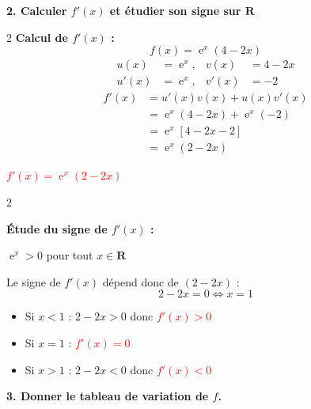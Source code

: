 \documentclass[11pt,a4paper]{article}
\DeclareMathOperator{\e}{e}
\begin{document}
\vspace{3mm}

\textbf{2. Calculer $f'(x)$ et étudier son signe sur $\mathbf{R}$}

\begin{tcolorbox}[colback=red!5!white,colframe=red!75!black]
{
\begin{multicols}{2}
\textbf{Calcul de $f'(x)$ :}
\[
f(x) = \e^x(4-2x)
\]
\[
\begin{aligned}
u(x) &= \e^x, & v(x) &= 4-2x \\
u'(x) &= \e^x, & v'(x) &= -2
\end{aligned}
\]
\[
\begin{aligned}
    f'(x) & = u'(x)v(x) + u(x)v'(x)  \\
            & = \e^x(4-2x) + \e^x(-2) \\
            & = \e^x[4-2x-2] \\
            & = \e^x(2-2x)
\end{aligned}
\]
\begin{center}
\textbf{\textcolor{red}{$f'(x) = \e^x(2-2x)$}}
\end{center}
\end{multicols}
}
\end{tcolorbox}

\begin{tcolorbox}[colback=red!5!white,colframe=red!75!black]
\begin{multicols}{2}
{
\textbf{Étude du signe de $f'(x)$ :}

$\e^x > 0$ pour tout $x \in \mathbf{R}$

Le signe de $f'(x)$ dépend donc de $(2-2x)$ :
\[
2-2x = 0 \Longleftrightarrow x = 1
\]

\vspace{2mm}

\begin{itemize}
    \item Si $x < 1$ : $2-2x > 0$ donc \textbf{\textcolor{red}{$f'(x) > 0$}}
    \item Si $x = 1$ : \textbf{\textcolor{red}{$f'(x) = 0$}}
    \item Si $x > 1$ : $2-2x < 0$ donc \textbf{\textcolor{red}{$f'(x) < 0$}}
\end{itemize}
}
\end{multicols}
\end{tcolorbox}

\vspace{3mm}

\textbf{3. Donner le tableau de variation de $f$.}
\end{document}
